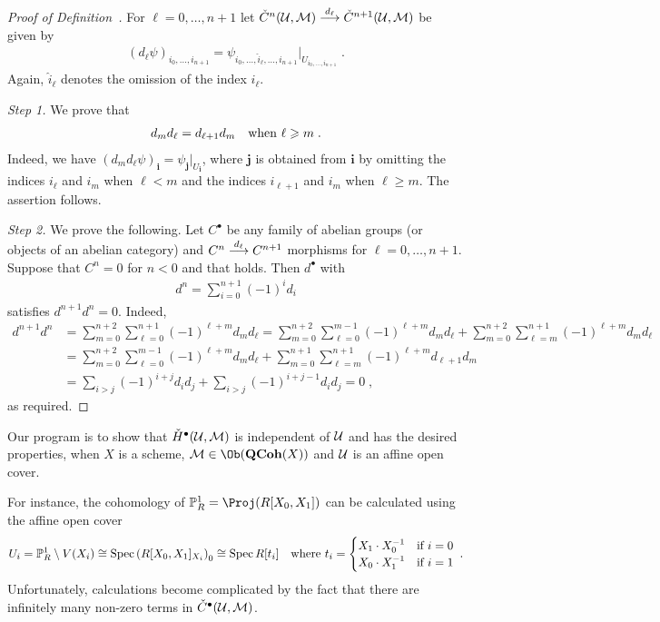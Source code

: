 \documentclass[a4paper,parskip=half,numbers=enddot, DIV=12]{scrreprt}
\renewcommand{\geq}{\geqslant}
\begin{document}
\begin{proof}[Proof of Definition~]
	For $\ell=0,\ldots,n+1$ let $\check{C}^n(\Uu,\Mm)\morphism[d_\ell]\check{C}^{n+1}(\Uu,\Mm)$ be given by
	\begin{align*}
		(d_\ell\psi)_{i_0,\ldots,i_{n+1}}=\psi_{i_0,\ldots,\hat{i}_\ell,\ldots,i_{n+1}}|_{U_{i_0,\ldots,i_{n+1}}}\;.
	\end{align*}
	Again, $\hat{i}_\ell$ denotes the omission of the index $i_\ell$.
	
	\emph{Step 1.} We prove that
	\begin{align}\lbl{eq:simplicialStuff}
		d_md_\ell=d_{\ell+1}d_m\quad\text{when }\ell\geq m\;.
	\end{align}
	Indeed, we have $(d_md_\ell\psi)_{\boldsymbol{i}}=\psi_{\boldsymbol{j}}|_{U_{\boldsymbol{i}}}$, where $\boldsymbol{j}$ is obtained from $\boldsymbol{i}$ by omitting the indices $i_\ell$ and $i_m$ when $\ell<m$ and the indices $i_{\ell+1}$ and $i_m$ when $\ell\geq m$. The assertion follows.
	
	\emph{Step 2.} We prove the following. Let $C^\bullet $ be any family of abelian groups (or objects of an abelian category) and $C^n\morphism[d_\ell]C^{n+1}$ morphisms for $\ell=0,\ldots,n+1$. Suppose that $C^n=0$ for $n<0$ and that  holds. Then $d^\bullet$ with
	\begin{align*}
		d^n=\sum_{i=0}^{n+1}(-1)^id_i
	\end{align*}
	satisfies $d^{n+1}d^n=0$. Indeed,
	\begin{align*}
		d^{n+1}d^n&=\sum_{m=0}^{n+2}\sum_{\ell=0}^{n+1}(-1)^{\ell+m}d_md_\ell=\sum_{m=0}^{n+2}\sum_{\ell=0}^{m-1}(-1)^{\ell+m}d_md_\ell+\sum_{m=0}^{n+2}\sum_{\ell=m}^{n+1}(-1)^{\ell+m}d_md_\ell\\
		&=\sum_{m=0}^{n+2}\sum_{\ell=0}^{m-1}(-1)^{\ell+m}d_md_\ell+\sum_{m=0}^{n+1}\sum_{\ell=m}^{n+1}(-1)^{\ell+m}d_{\ell+1}d_m\\
		&=\sum_{i>j}(-1)^{i+j}d_id_j+\sum_{i>j}(-1)^{i+j-1}d_id_j=0\;,
	\end{align*}
	as required.
\end{proof}
\begin{rem*}
	Our program is to show that $\check{H}^\bullet (\mathcal{U},\mathcal{M})$ is independent of $\mathcal{U}$ and has the desired properties, when $X$ is a scheme, $\Mm\in\Ob(\cat{QCoh}(X))$ and $\mathcal{U}$ is an affine open cover.
\end{rem*}
\begin{rem*}
	For instance, the cohomology of $\IP_R^1=\Proj(R[X_0,X_1])$ can be calculated using the affine open cover 
	\begin{align*}
		U_i=\mathbb{P}_R^1\setminus V(X_i)\cong \operatorname{Spec} \left(R[X_0,X_1]_{X_i}\right)_0\cong \operatorname{Spec} R[t_i]\quad\text{where }t_i=
		\begin{cases}
			X_1\cdot X_0^{-1} & \text{if }i=0\\
			X_0\cdot X_1^{-1} & \text{if }i=1
		\end{cases}\;.
	\end{align*}
	Unfortunately, calculations become complicated by the fact that there are infinitely many non-zero terms in $\check{C}^\bullet (\mathcal{U},\mathcal{M})$.
\end{rem*}
\end{document}
